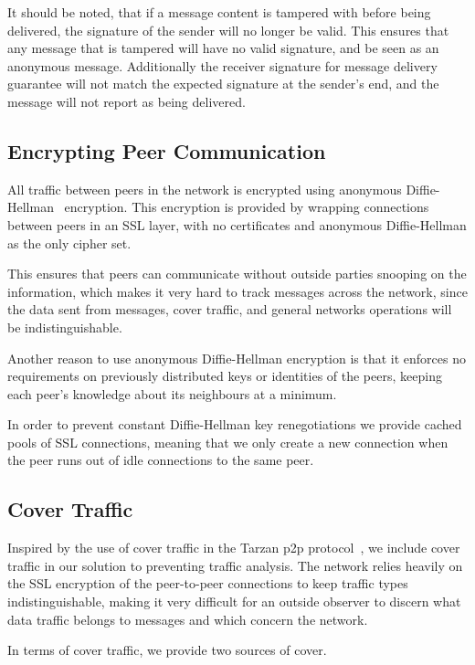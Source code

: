 It should be noted, that if a message content is tampered with before being delivered, the signature of the sender will no longer be valid. This ensures that any message that is tampered will have no valid signature, and be seen as an anonymous message.
Additionally the receiver signature for message delivery guarantee will not match the expected signature at the sender's end, and the message will not report as being delivered.
 
\subsection{Encrypting Peer Communication}

All traffic between peers in the network is encrypted using anonymous Diffie-Hellman~\citep{DH} encryption. This encryption is provided by wrapping connections between peers in an SSL layer, with no certificates and anonymous Diffie-Hellman as the only cipher set.

This ensures that peers can communicate without outside parties snooping on the information, which makes it very hard to track messages across the network, since the data sent from messages, cover traffic, and general networks operations will be indistinguishable.

Another reason to use anonymous Diffie-Hellman encryption is that it enforces no requirements on previously distributed keys or identities of the peers, keeping each peer's knowledge about its neighbours at a minimum.

In order to prevent constant Diffie-Hellman key renegotiations we provide cached pools of SSL connections, meaning that we only create a new connection when the peer runs out of idle connections to the same peer.

\subsection{Cover Traffic}

Inspired by the use of cover traffic in the Tarzan p2p protocol~\citep{tarzan}, we include cover traffic in our solution to preventing traffic analysis. The network relies heavily on the SSL encryption of the peer-to-peer connections to keep traffic types indistinguishable, making it very difficult for an outside observer to discern what data traffic belongs to messages and which concern the network.

In terms of cover traffic, we provide two sources of cover.

